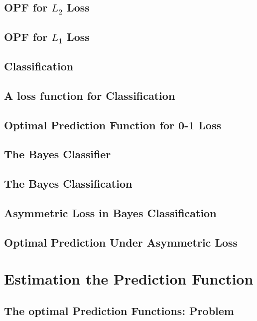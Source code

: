 \documentclass[11pt,a4paper]{article}
\begin{document}
\subsection{OPF for $L_2$ Loss}

\subsection{OPF for $L_1$ Loss}

\subsection{Classification}

\subsection{A loss function for Classification}

\subsection{Optimal Prediction Function for 0-1 Loss}

\subsection{The Bayes Classifier}

\subsection{The Bayes Classification}

\subsection{Asymmetric Loss in Bayes Classification}

\subsection{Optimal Prediction Under Asymmetric Loss}

\section{Estimation the Prediction Function}

\subsection{The optimal Prediction Functions: Problem}
\end{document}
